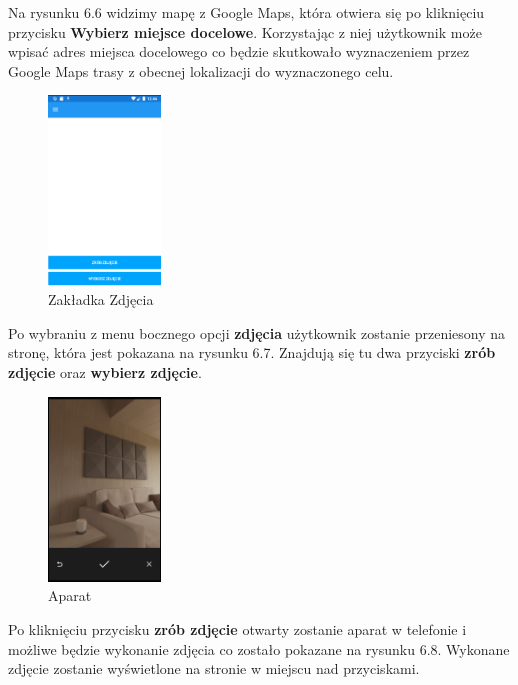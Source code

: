 Na rysunku 6.6 widzimy mapę z Google Maps, która otwiera się po kliknięciu przycisku \textbf{Wybierz miejsce docelowe}. Korzystając z niej użytkownik może wpisać adres miejsca docelowego co będzie skutkowało wyznaczeniem przez Google Maps trasy z obecnej lokalizacji do wyznaczonego celu.

\begin{figure}[!htb]
	\begin{center}
		\includegraphics[width=3cm]{rys/ZZf1.png}
		\caption{Zakładka Zdjęcia}
		\label{rys:rysunek047}
	\end{center}
\end{figure}

Po wybraniu z menu bocznego opcji \textbf{zdjęcia} użytkownik zostanie przeniesony na stronę, która jest pokazana na rysunku 6.7. Znajdują się tu dwa przyciski \textbf{zrób zdjęcie} oraz \textbf{wybierz zdjęcie}.

\begin{figure}[!htb]
	\begin{center}
		\includegraphics[width=3cm]{rys/ZZf2.png}
		\caption{Aparat}
		\label{rys:rysunek048}
	\end{center}
\end{figure}

Po kliknięciu przycisku \textbf{zrób zdjęcie} otwarty zostanie aparat w telefonie i możliwe będzie wykonanie zdjęcia co zostało pokazane na rysunku 6.8. Wykonane zdjęcie zostanie wyświetlone na stronie w miejscu nad przyciskami.

